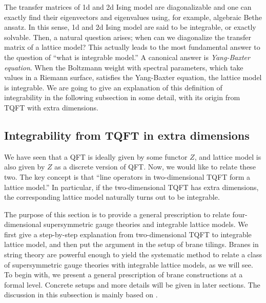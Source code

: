 The transfer matrices of 1d and 2d Ising model are diagonalizable
and one can exactly find their eigenvectors and eigenvalues using,
for example, algebraic Bethe ansatz. In this sense, 1d and 2d Ising
model are said to be integrable, or exactly solvable. Then, a natural
question arises; when can we diagonalize the transfer matrix of a
lattice model? This actually leads to the most fundamental answer
to the question of ``what is integrable model.'' A canonical answer
is \emph{Yang-Baxter equation}. When the Boltzmann weight with spectral
parameters, which take values in a Riemann surface, satisfies the
Yang-Baxter equation, the lattice model is integrable. We are going to give
an explanation of this definition of integrability in the following subsection
in some detail, with its origin from TQFT with extra dimensions.







\subsection{Integrability from TQFT in extra dimensions}
\label{sec:integrability_from_TQFT}

We have seen that a QFT is ideally given by some functor $Z$, and
lattice model is also given by $Z$ as a discrete version of QFT.
Now, we would like to relate these two. The key concept is that
``line operators in two-dimensional TQFT form a lattice model.''
In particular, if the two-dimensional TQFT has extra dimensions, the corresponding
lattice model naturally turns out to be integrable.


The purpose of this section is to provide a general prescription to relate four-dimensional
supersymmetric gauge theories and integrable lattice models.
We first give a step-by-step
explanation from two-dimensional TQFT to integrable lattice model,
and then put the argument in the setup of brane tilings. Branes in
string theory are powerful enough to yield the systematic method to
relate a class of supersymmetric gauge theories with integrable lattice
models, as we will see. To begin with, we present a general prescription
of brane constructions at a formal level. Concrete setups and more
details will be given in later sections.
The discussion in this subsection is mainly based on \cite{Yagi:2015lha}.







